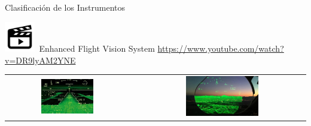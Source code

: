 \begin{frame}{Clasificaci\'on de los Instrumentos}



\vspace{3mm}

{\includegraphics[width=0.1\textwidth]{imagenes/Video.png}}\,
Enhanced Flight Vision System \url{https://www.youtube.com/watch?v=DR9lyAM2YNE}

\vspace{3mm}

  \begin{tabular}{ccc}
    \includegraphics[width=0.45\textwidth]{imagenes/1.2.clasificacion.instrumentos/EFVS_Photo.jpg} & \hspace{3mm}
    &     \includegraphics[width=0.45\textwidth]{imagenes/1.2.clasificacion.instrumentos/efvs.jpg} \\
  \end{tabular}
  

\end{frame}
